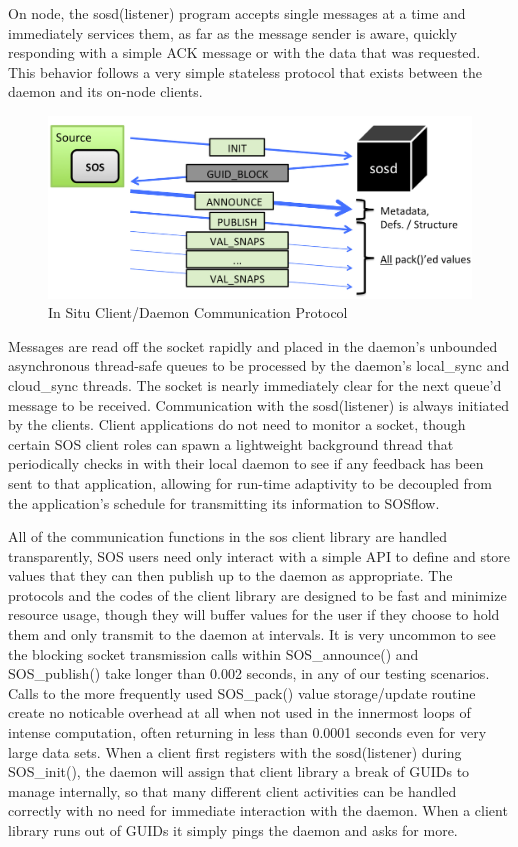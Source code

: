 On node, the sosd(listener) program accepts single messages at a time
and immediately services them, as far as the message sender is aware,
quickly responding with a simple ACK message or with the data that was
requested.  This behavior follows a very simple stateless protocol
that exists between the daemon and its on-node clients.

\begin{figure}[!t]
\centering
\includegraphics[width=5in]{images/sosd_protocol.png}
\caption{In Situ Client/Daemon Communication Protocol}
\label{fig_sim}
\end{figure}

Messages are read off the socket rapidly and placed in the daemon's
unbounded asynchronous thread-safe queues to be processed by the
daemon's local\_sync and cloud\_sync threads.
%
The socket is nearly immediately clear for the next queue'd message to
be received.
%
Communication with the sosd(listener) is always initiated by the
clients.
%
Client applications do not need to monitor a socket, though certain
SOS client roles can spawn a lightweight background thread that
periodically checks in with their local daemon to see if any feedback
has been sent to that application, allowing for run-time adaptivity to
be decoupled from the application's schedule for transmitting its
information to SOSflow.

All of the communication functions in the sos client library are
handled transparently, SOS users need only interact with a simple API
to define and store values that they can then publish up to the daemon
as appropriate.
%
The protocols and the codes of the client library are designed to be
fast and minimize resource usage, though they will buffer values for
the user if they choose to hold them and only transmit to the daemon
at intervals.
%
It is very uncommon to see the blocking socket transmission calls
within SOS\_announce() and SOS\_publish() take longer than 0.002
seconds, in any of our testing scenarios. Calls to the more frequently
used SOS\_pack() value storage/update routine create no noticable
overhead at all when not used in the innermost loops of intense
computation, often returning in less than 0.0001 seconds even for very
large data sets.
%
When a client first registers with the sosd(listener) during
SOS\_init(), the daemon will assign that client library a break of
GUIDs to manage internally, so that many different client activities
can be handled correctly with no need for immediate interaction with
the daemon.
%
When a client library runs out of GUIDs it simply pings the daemon and
asks for more.

